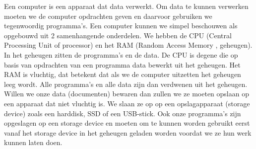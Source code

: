 Een computer is een apparaat dat data verwerkt. Om data te kunnen verwerken moeten we de computer opdrachten geven en daarvoor gebruiken we tegenwoordig programma's. Een computer kunnen we simpel beschouwen als opgebouwd uit 2 samenhangende onderdelen. We hebben de CPU (Central Processing Unit of processor) en het RAM (Random Access Memory , geheugen). In het geheugen zitten de programma's en de data. De CPU is degene die op basis van opdrachten van een programma data bewerkt uit het geheugen. Het RAM is vluchtig, dat betekent dat als we de computer uitzetten het geheugen leeg wordt. Alle programma's en alle data zijn dan verdwenen uit het geheugen. Willen we onze data (documenten) bewaren dan zullen we ze moeten opslaan op een apparaat dat niet vluchtig is. We slaan ze op op een opslagapparaat (storage device) zoals een harddisk, SSD of een USB-stick. Ook onze programma's zijn opgeslagen op een storage device en moeten om te kunnen worden gebruikt eerst vanaf het storage device in het geheugen geladen worden voordat we ze hun werk kunnen laten doen.

